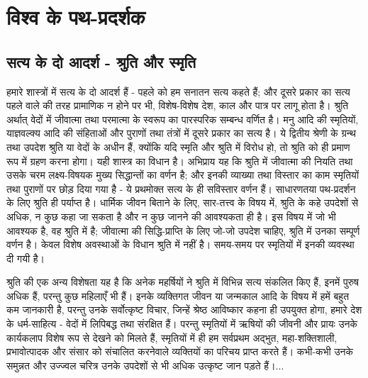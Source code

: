 
\chapter{विश्व के पथ-प्रदर्शक }

\indentsecionsintoc

\addtoendnotes{\protect\newpage}



\section*{सत्य के दो आदर्श - श्रुति और स्मृति}


हमारे शास्त्रों में सत्य के दो आदर्श हैं - पहले को हम सनातन सत्य कहते हैं; और दूसरे प्रकार का सत्य पहले वाले की तरह प्रामाणिक न होने पर भी, विशेष-विशेष देश, काल और पात्र पर लागू होता है। श्रुति अर्थात् वेदों में जीवात्मा तथा परमात्मा के स्वरूप का पारस्परिक सम्बन्ध वर्णित है। मनु आदि की स्मृतियों, याज्ञवल्क्य आदि की संहिताओं और पुराणों तथा तंत्रों में दूसरे प्रकार का सत्य है। ये द्वितीय श्रेणी के ग्रन्थ तथा उपदेश श्रुति या वेदों के अधीन हैं, क्योंकि यदि स्मृति और श्रुति में विरोध हो, तो श्रुति को ही प्रमाण रूप में ग्रहण करना होगा। यही शास्त्र का विधान है। अभिप्राय यह कि श्रुति में जीवात्मा की नियति तथा उसके चरम लक्ष्य-विषयक मुख्य सिद्धान्तों का वर्णन है; और इनकी व्याख्या तथा विस्तार का काम स्मृतियों तथा पुराणों पर छोड़ दिया गया है - ये प्रथमोक्त सत्य के ही सविस्तार वर्णन हैं। साधारणतया पथ-प्रदर्शन के लिए श्रुति ही पर्याप्त है। धार्मिक जीवन बिताने के लिए, सार-तत्त्व के विषय में, श्रुति के कहे उपदेशों से अधिक, न कुछ कहा जा सकता है और न कुछ जानने की आवश्यकता ही है। इस विषय में जो भी आवश्यक है, वह श्रुति में है; जीवात्मा की सिद्धि-प्राप्ति के लिए जो-जो उपदेश चाहिए, श्रुति में उनका सम्पूर्ण वर्णन है। केवल विशेष अवस्थाओं के विधान श्रुति में नहीं है। समय-समय पर स्मृतियों में इनकी व्यवस्था दी गयी है। 

श्रुति की एक अन्य विशेषता यह है कि अनेक महर्षियों ने श्रुति में विभिन्न सत्य संकलित किए हैं, इनमें पुरुष अधिक हैं, परन्तु कुछ महिलाएँ भी हैं। इनके व्यक्तिगत जीवन या जन्मकाल आदि के विषय में हमें बहुत कम जानकारी है, परन्तु उनके सर्वोत्कृष्ट विचार, जिन्हें श्रेष्ठ आविष्कार कहना ही उपयुक्त होगा, हमारे देश के धर्म-साहित्य - वेदों में लिपिबद्ध तथा संरक्षित हैं। परन्तु स्मृतियों में ऋषियों की जीवनी और प्रायः उनके कार्यकलाप विशेष रूप से देखने को मिलते हैं, स्मृतियों में ही हम सर्वप्रथम अद्भुत, महा-शक्तिशाली, प्रभावोत्पादक और संसार को संचालित करनेवाले व्यक्तियों का परिचय प्राप्त करते हैं। कभी-कभी उनके समुन्नत और उज्ज्वल चरित्र उनके उपदेशों से भी अधिक उत्कृष्ट जान पड़ते हैं।... 

